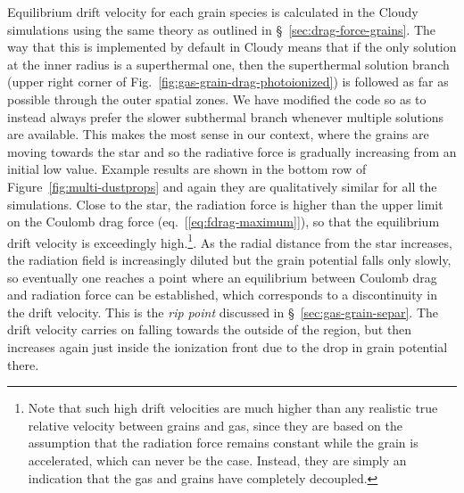 Equilibrium drift velocity for each grain species is calculated in the
Cloudy simulations using the same theory \citep{Draine:1979a} as outlined
in \S~\ref{sec:drag-force-grains}.  The way that this is implemented
by default in Cloudy means that if the only solution at the inner
radius is a superthermal one, then the superthermal solution branch
(upper right corner of Fig.~\ref{fig:gas-grain-drag-photoionized}) is
followed as far as possible through the outer spatial zones.  We have
modified the code so as to instead always prefer the slower subthermal
branch whenever multiple solutions are available.  This makes the most
sense in our context, where the grains are moving towards the star and
so the radiative force is gradually increasing from an initial low
value.  Example results are shown in the bottom row of
Figure~\ref{fig:multi-dustprops} and again they are qualitatively
similar for all the simulations.  Close to the star, the radiation force is
higher than the upper limit on the Coulomb drag force
(eq.~[\ref{eq:fdrag-maximum}]), so that the equilibrium drift velocity
is exceedingly high.\footnote{Note that such high drift velocities are
  much higher than any realistic true relative velocity between grains
  and gas, since they are based on the assumption that the radiation
  force remains constant while the grain is accelerated, which can
  never be the case.  Instead, they are simply an indication that the
  gas and grains have completely decoupled.}.  As the radial distance
from the star increases, the radiation field is increasingly diluted
but the grain potential falls only slowly, so eventually one reaches a
point where an equilibrium between Coulomb drag and radiation force
can be established, which corresponds to a discontinuity in the drift
velocity.  This is the \textit{rip point} discussed in
\S~\ref{sec:gas-grain-separ}.  The drift velocity carries on falling
towards the outside of the \hii{} region, but then increases again
just inside the ionization front due to the drop in grain potential
there.

